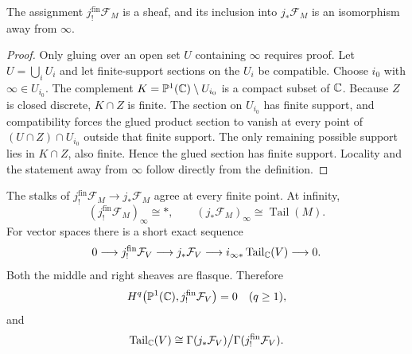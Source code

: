 \begin{lemma}
\label{lem:ds-jfin-sheaf}
The assignment $j^{\mathrm{fin}}_!\mathcal F_M$ is a sheaf, and its inclusion into
$j_*\mathcal F_M$ is an isomorphism away from $\infty$.
\end{lemma}

\begin{proof}
Only gluing over an open set $U$ containing $\infty$ requires proof.  Let
$U=\bigcup_iU_i$ and let finite-support sections on the $U_i$ be compatible.
Choose $i_0$ with $\infty\in U_{i_0}$.  The complement
$K=\mathbb P^1(\mathbb C)\setminus U_{i_0}$ is a compact subset of $\mathbb C$.  Because $Z$
is closed discrete, $K\cap Z$ is finite.  The section on $U_{i_0}$ has finite
support, and compatibility forces the glued product section to vanish at every
point of $(U\cap Z)\cap U_{i_0}$ outside that finite support.  The only remaining
possible support lies in $K\cap Z$, also finite.  Hence the glued section has
finite support.  Locality and the statement away from $\infty$ follow directly
from the definition.
\end{proof}

\begin{theorem}
\label{thm:ds-tail-stalk}
The stalks of $j^{\mathrm{fin}}_!\mathcal F_M\to j_*\mathcal F_M$ agree at every
finite point.  At infinity,
\[
 (j^{\mathrm{fin}}_!\mathcal F_M)_\infty\cong *,
 \qquad
 (j_*\mathcal F_M)_\infty\cong\operatorname{Tail}(M).
\]
For vector spaces there is a short exact sequence
\[
 0\longrightarrow j^{\mathrm{fin}}_!\mathcal F_V
 \longrightarrow j_*\mathcal F_V
 \longrightarrow i_{\infty*}\operatorname{Tail}_{\mathbb C}(V)
 \longrightarrow0.
\]
Both the middle and right sheaves are flasque.  Therefore
\[
 H^q\!\left(\mathbb P^1(\mathbb C),j^{\mathrm{fin}}_!\mathcal F_V\right)=0
 \quad(q\geq1),
\]
and
\[
 \operatorname{Tail}_{\mathbb C}(V)
 \cong
 \Gamma(j_*\mathcal F_V)\big/\Gamma(j^{\mathrm{fin}}_!\mathcal F_V).
\]
\end{theorem}


